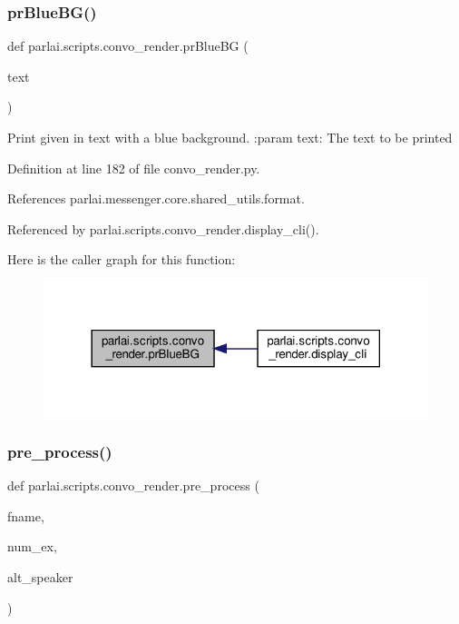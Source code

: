 \subsubsection{\texorpdfstring{pr\+Blue\+B\+G()}{prBlueBG()}}
{\footnotesize\ttfamily def parlai.\+scripts.\+convo\+\_\+render.\+pr\+Blue\+BG (\begin{DoxyParamCaption}\item[{}]{text }\end{DoxyParamCaption})}

\begin{DoxyVerb}Print given in text with a blue background.
:param text: The text to be printed
\end{DoxyVerb}
 

Definition at line 182 of file convo\+\_\+render.\+py.



References parlai.\+messenger.\+core.\+shared\+\_\+utils.\+format.



Referenced by parlai.\+scripts.\+convo\+\_\+render.\+display\+\_\+cli().

Here is the caller graph for this function\+:
\nopagebreak
\begin{figure}[H]
\begin{center}
\leavevmode
\includegraphics[width=318pt]{namespaceparlai_1_1scripts_1_1convo__render_a21a7681b9803eb6994ac72c7d480cb94_icgraph}
\end{center}
\end{figure}
\mbox{\label{namespaceparlai_1_1scripts_1_1convo__render_a0f0a031443ca797c936d2961a702a45e}} 
\subsubsection{\texorpdfstring{pre\+\_\+process()}{pre\_process()}}
{\footnotesize\ttfamily def parlai.\+scripts.\+convo\+\_\+render.\+pre\+\_\+process (\begin{DoxyParamCaption}\item[{}]{fname,  }\item[{}]{num\+\_\+ex,  }\item[{}]{alt\+\_\+speaker }\end{DoxyParamCaption})}

